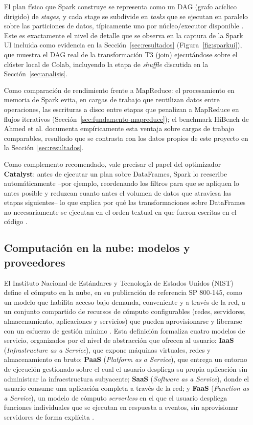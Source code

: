 \documentclass[11pt,a4paper]{article}
\begin{document}
El plan f\'isico que Spark construye se representa como un DAG (grafo
ac\'iclico dirigido) de \emph{stages}, y cada stage se subdivide en
\emph{tasks} que se ejecutan en paralelo sobre las particiones de datos,
t\'ipicamente uno por n\'ucleo/executor disponible \cite{zaharia2016}. Este
es exactamente el nivel de detalle que se observa en la captura de la Spark
UI incluida como evidencia en la Secci\'on~\ref{sec:resultados}
(Figura~\ref{fig:sparkui}), que muestra el DAG real de la transformaci\'on T3
(join) ejecut\'andose sobre el cl\'uster local de Colab, incluyendo la etapa
de \emph{shuffle} discutida en la Secci\'on~\ref{sec:analisis}.

Como comparaci\'on de rendimiento frente a MapReduce: el procesamiento en
memoria de Spark evita, en cargas de trabajo que reutilizan datos entre
operaciones, las escrituras a disco entre etapas que penalizan a MapReduce en
flujos iterativos (Secci\'on~\ref{sec:fundamento-mapreduce}); el benchmark
HiBench de Ahmed et al. \cite{ahmed2020} documenta emp\'iricamente esta
ventaja sobre cargas de trabajo comparables, resultado que se contrasta con
los datos propios de este proyecto en la Secci\'on~\ref{sec:resultados}.

Como complemento recomendado, vale precisar el papel del optimizador
\textbf{Catalyst}: antes de ejecutar un plan sobre DataFrames, Spark lo
reescribe autom\'aticamente --por ejemplo, reordenando los filtros para que
se apliquen lo antes posible y reduzcan cuanto antes el volumen de datos que
atraviesa las etapas siguientes-- lo que explica por qu\'e las
transformaciones sobre DataFrames no necesariamente se ejecutan en el orden
textual en que fueron escritas en el c\'odigo \cite{zaharia2016,chambers2018}.

\subsection{Computaci\'on en la nube: modelos y proveedores}
\label{sec:fundamento-nube}

El Instituto Nacional de Est\'andares y Tecnolog\'ia de Estados Unidos (NIST)
define el c\'omputo en la nube, en su publicaci\'on de referencia SP 800-145,
como un modelo que habilita acceso bajo demanda, conveniente y a trav\'es de
la red, a un conjunto compartido de recursos de c\'omputo configurables
(redes, servidores, almacenamiento, aplicaciones y servicios) que pueden
aprovisionarse y liberarse con un esfuerzo de gesti\'on m\'inimo
\cite{mell2011}. Esta definici\'on formaliza cuatro modelos de servicio,
organizados por el nivel de abstracci\'on que ofrecen al usuario:
\textbf{IaaS} (\emph{Infrastructure as a Service}), que expone m\'aquinas
virtuales, redes y almacenamiento en bruto; \textbf{PaaS} (\emph{Platform as
a Service}), que entrega un entorno de ejecuci\'on gestionado sobre el cual
el usuario despliega su propia aplicaci\'on sin administrar la
infraestructura subyacente; \textbf{SaaS} (\emph{Software as a Service}),
donde el usuario consume una aplicaci\'on completa a trav\'es de la red; y
\textbf{FaaS} (\emph{Function as a Service}), un modelo de c\'omputo
\emph{serverless} en el que el usuario despliega funciones individuales que
se ejecutan en respuesta a eventos, sin aprovisionar servidores de forma
expl\'icita \cite{mell2011}.
\end{document}
